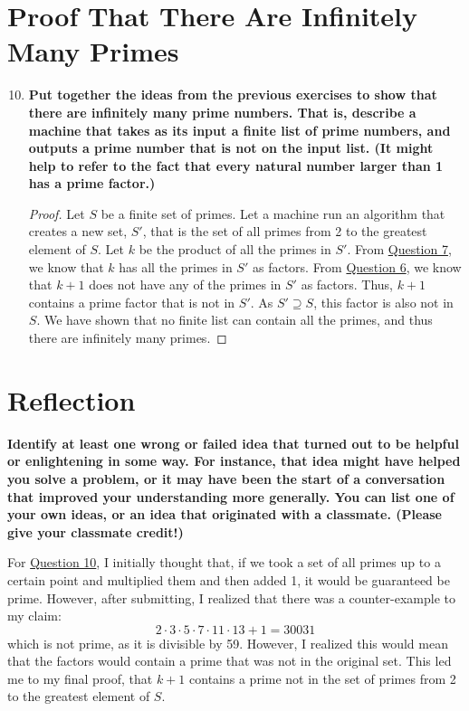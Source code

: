 \documentclass[article, 12pt]{article}
\theoremstyle{definition}
\begin{document}
    \section{Proof That There Are Infinitely Many Primes}
    \begin{enumerate}[(1)]
        \setcounter{enumi}{9}
        \item \textbf{Put together the ideas from the previous exercises to show that there are infinitely many prime numbers. That is, describe a machine that takes as its input a finite list of prime numbers, and outputs a prime number that is not on the input list. (It might help to refer to the fact that every natural number larger than 1 has a prime factor.)}\label{question:prove infinitely many primes}
        \begin{proof}
            Let $S$ be a finite set of primes. Let a machine run an algorithm that creates a new set, $S'$, that is the set of all primes from 2 to the greatest element of $S$. Let $k$ be the product of all the primes in $S'$. From \hyperref[question:produce k]{Question 7}, we know that $k$ has all the primes in $S'$ as factors. From \hyperref[question:k + 1 cannot have n as a factor]{Question 6}, we know that $k+1$ does not have any of the primes in $S'$ as factors. Thus, $k+1$ contains a prime factor that is not in $S'$. As $S' \supseteq S$, this factor is also not in $S$. We have shown that no finite list can contain all the primes, and thus there are infinitely many primes.
        \end{proof}
    \end{enumerate}
    \section{Reflection}
        \textbf{Identify at least one wrong or failed idea that turned out to be helpful or enlightening in some way. For instance, that idea might have helped you solve a problem, or it may have been the start of a conversation that improved your understanding more generally. You can list one of your own ideas, or an idea that originated with a classmate. (Please give your classmate credit!)}

        For \hyperref[question:full proof]{Question 10}, I initially thought that, if we took a set of all primes up to a certain point and multiplied them and then added 1, it would be guaranteed be prime. However, after submitting, I realized that there was a counter-example to my claim:
        \[  2 \cdot 3 \cdot 5 \cdot 7 \cdot 11 \cdot 13 + 1=30031 \]
        which is not prime, as it is divisible by 59. However, I realized this would mean that the factors would contain a prime that was not in the original set. This led me to my final proof, that $k+1$ contains a prime not in the set of primes from 2 to the greatest element of $S$.
\end{document}

